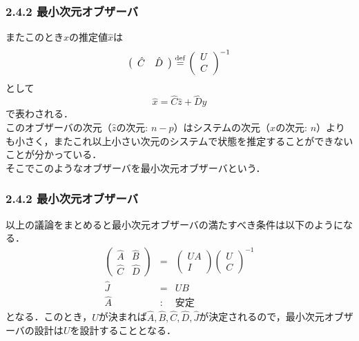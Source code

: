 \begin{frame}[t]
\frametitle{2.4.2 最小次元オブザーバ}
またこのとき$x$の推定値$\hat{x}$は
\begin{equation}
   \left(\begin{array}{cc}
	\hat{C} & \hat{D} \\
   \end{array}\right)
	\stackrel{\rm def}{=} \left(\begin{array}{c}
			U \\
			C 
		\end{array}\right) ^{-1}
\end{equation}
として
\begin{equation}
   \hat{x} = \hat{C} \hat{z} + \hat{D}y
\end{equation}
で表わされる．
\\[3mm]

このオブザーバの次元（$\hat{z}$の次元: $n-p$）はシステムの次元（$x$の次元: $n$）よりも小さく，またこれ以上小さい次元のシステムで状態を推定することができないことが分かっている．
\\[3mm]

そこでこのようなオブザーバを最小次元オブザーバという．
\end{frame}

\begin{frame}[t]
\frametitle{2.4.2 最小次元オブザーバ}
以上の議論をまとめると最小次元オブザーバの満たすべき条件は以下のようになる．
\begin{eqnarray}
   \left(\begin{array}{cc}
	\hat{A} & \hat{B} \\
	\hat{C} & \hat{D}
   \end{array}\right)
   & = &   \left(\begin{array}{c}
		UA \\
		I
	   \end{array}\right)
	   \left(\begin{array}{c}
		U \\
		C
	   \end{array}\right) ^{-1}
\label{obs_cond_1} \\
   \hat{J} & = & UB
\label{obs_cond_2} \\
   \hat{A} & : & \mbox{安定}
\label{obs_cond_3}
\end{eqnarray}
となる．このとき，$U$が決まれば$\hat{A},\hat{B},\hat{C},\hat{D},\hat{J}$が決定されるので，最小次元オブザーバの設計は$U$を設計することとなる．

\end{frame}

